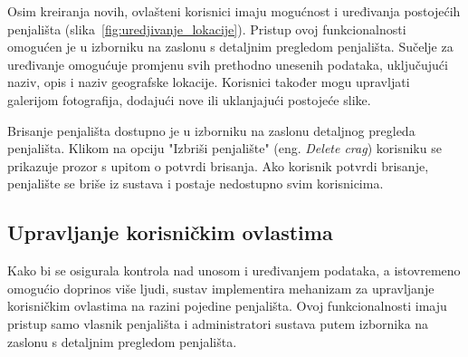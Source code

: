 Osim kreiranja novih, ovlašteni korisnici imaju mogućnost i uređivanja postojećih penjališta (slika~\ref{fig:uredjivanje_lokacije}). Pristup ovoj funkcionalnosti omogućen je u izborniku na zaslonu s detaljnim pregledom penjališta. 
Sučelje za uređivanje omogućuje promjenu svih prethodno unesenih podataka, uključujući naziv, opis i naziv geografske lokacije. Korisnici također mogu upravljati galerijom fotografija, dodajući nove ili uklanjajući postojeće slike. 

Brisanje penjališta dostupno je u izborniku na zaslonu detaljnog pregleda penjališta. Klikom na opciju "Izbriši penjalište" (eng. \textit{Delete crag}) korisniku se prikazuje prozor s upitom o potvrdi brisanja. Ako korisnik potvrdi brisanje, penjalište se briše iz sustava i postaje nedostupno svim korisnicima.

\subsection{Upravljanje korisničkim ovlastima}

Kako bi se osigurala kontrola nad unosom i uređivanjem podataka, a istovremeno omogućio doprinos više ljudi, sustav implementira mehanizam za upravljanje korisničkim ovlastima na razini pojedine penjališta. Ovoj funkcionalnosti imaju pristup samo vlasnik penjališta i administratori sustava putem izbornika na zaslonu s detaljnim pregledom penjališta. 

